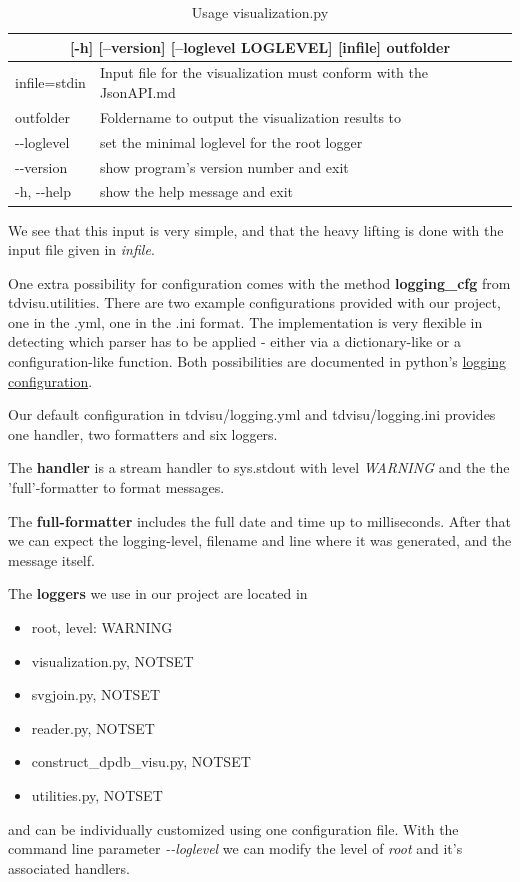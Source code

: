 \documentclass[a4paper, 12pt, bibliography=totoc]{scrartcl}
\begin{document}
\def\arraystretch{1.2}%
\begin{longtable}{|ll|}
	\caption{Usage visualization.py 
		\label{tab:optionstdvisu}}\\
	\hline 
	\multicolumn{2}{|c|}{[-h] [--version] [--loglevel LOGLEVEL] [infile] outfolder}
	\\[2ex]
	\endfirsthead

	infile=stdin &  Input file for the visualization must conform with the JsonAPI.md\\
	outfolder &  Foldername to output the visualization results to\\
	-{}-loglevel  &   set the minimal loglevel for the root logger\\
	-{}-version & show program's version number and exit\\
	-h, -{}-help & show the help message and exit\\
	\hline
\end{longtable}

We see that this input is very simple, and that the heavy lifting is done with the input file given in \textit{infile}.

One extra possibility for configuration comes with the method \textbf{logging\_cfg} from {tdvisu.utilities}. There are two example configurations provided with our project, one in the .yml, one in the .ini format. The implementation is very flexible in detecting which parser has to be applied - either via a dictionary-like or a configuration-like function. Both possibilities are documented in python's \href{https://docs.python.org/3/library/logging.config.html#logging-config-api}{logging configuration}.

Our default configuration in tdvisu/logging.yml and tdvisu/logging.ini provides one handler, two formatters and six loggers.

The \textbf{handler} is a stream handler to sys.stdout with level \textit{WARNING} and the the 'full'-formatter to format messages.

The \textbf{full-formatter} includes the full date and time up to milliseconds. After that we can expect the logging-level, filename and line where it was generated, and the message itself.

The \textbf{loggers} we use in our project are located in 
\begin{itemize}
	\item root, level: WARNING
	\item visualization.py, NOTSET
	\item svgjoin.py, NOTSET
    \item reader.py, NOTSET
	\item construct\_dpdb\_visu.py, NOTSET
	\item utilities.py, NOTSET
\end{itemize}
and can be individually customized using one configuration file.
With the command line parameter \textit{-{}-loglevel} we can modify the level of \textit{root} and it's associated handlers.
\end{document}
